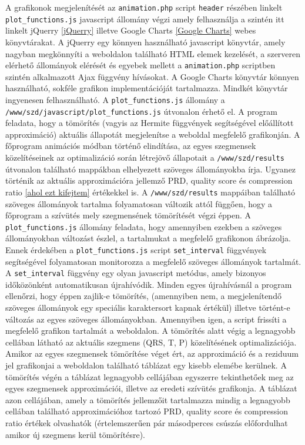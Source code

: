 \documentclass[oneside,titlepage,12pt,a4paper]{report}
\begin{document}
\par A grafikonok megjelenítését az \texttt{animation.php} script \texttt{header} részében linkelt \texttt{plot\_functions.js} javascript állomány végzi amely felhasználja a szintén itt linkelt jQuerry \ref{jQuerry} illetve Google Charts \ref{Google Charts} webes könyvtárakat. A jQuerry egy könnyen használható javascript könyvtár, amely nagyban megkönnyíti a weboldalon található HTML elemek kezelését, a szerveren elérhető állományok elérését és egyebek mellett a \texttt{animation.php} scriptben szintén alkalmazott Ajax függvény hívásokat. A Google Charts könyvtár könnyen használható, sokféle grafikon implementációját tartalmazza. Mindkét könyvtár ingyenesen felhasználható. A \texttt{plot\_functions.js} állomány a \texttt{/www/szd/javascript/plot\_functions.js} útvonalon érhető el. A program feladata, hogy a tömörítés (vagyis az Hermite függvények segítségével előállított approximáció) aktuális állapotát megjelenítse a weboldal megfelelő grafikonján. A főprogram animációs módban történő elindítása, az egyes szegmensek közelítéseinek az optimalizáció során létrejövő állapotait a \texttt{/www/szd/results} útvonalon található mappákban elhelyezett szöveges állományokba írja. Ugyanez történik az aktuális approximációra jellemző PRD, quality score és compression ratio \ref{ahol ezt kifejtem} értékekkel is. A \texttt{/www/szd/results} mappáiban található szöveges állományok tartalma folyamatosan változik attól függően, hogy a főprogram a szívütés mely szegmensének tömörítését végzi éppen. A \texttt{plot\_functions.js} állomány feladata, hogy amennyiben ezekben a szöveges állományokban változást észlel, a tartalmukat  a megfelelő grafikonon ábrázolja. Ennek érdekében a \texttt{plot\_functions.js} script \texttt{set\_interval} függvények segítségével folyamatosan monitorozza a megfelelő szöveges állományok tartalmát. A \texttt{set\_interval} függvény egy olyan javascript metódus, amely bizonyos időközönként automatikusan újrahívódik. Minden egyes újrahívásnál a program ellenőrzi, hogy éppen zajlik-e tömörítés, (amennyiben nem, a megjelenítendő szöveges állományok egy speciális karaktersort kapnak értékül) illetve történt-e változás az egyes szöveges állományokban. Amennyiben igen, a script frissíti a megfelelő grafikon tartalmát a weboldalon. A tömörítés alatt végig a legnagyobb cellában látható az aktuális szegmens (QRS, T, P) közelítésének optimalizációja. Amikor az egyes szegmensek tömörítése véget ért, az approximáció és a reziduum jel grafikonjai a weboldalon található táblázat egy kisebb elemébe kerülnek. A tömörítés végén a táblázat legnagyobb cellájában egyszerre tekinthetőek meg az egyes szegmensek approximációi, illetve az eredeti szívütés grafikonja. A táblázat azon cellájában, amely a tömörítés jellemzőit tartalmazza mindig a legnagyobb cellában található approximációhoz tartozó PRD, quality score és compression ratio értékek olvashatók (értelemszerűen pár másodperces csúszás előfordulhat amikor új szegmens kerül tömörítésre). 
\end{document}
